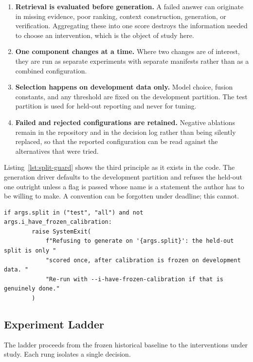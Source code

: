 \begin{enumerate}
  \item \textbf{Retrieval is evaluated before generation.} A failed answer can originate in missing evidence, poor ranking, context construction, generation, or verification. Aggregating these into one score destroys the information needed to choose an intervention, which is the object of study here.
  \item \textbf{One component changes at a time.} Where two changes are of interest, they are run as separate experiments with separate manifests rather than as a combined configuration.
  \item \textbf{Selection happens on development data only.} Model choice, fusion constants, and any threshold are fixed on the development partition. The test partition is used for held-out reporting and never for tuning.
  \item \textbf{Failed and rejected configurations are retained.} Negative ablations remain in the repository and in the decision log rather than being silently replaced, so that the reported configuration can be read against the alternatives that were tried.
\end{enumerate}

Listing~\ref{lst:split-guard} shows the third principle as it exists in the
code. The generation driver defaults to the development partition and refuses
the held-out one outright unless a flag is passed whose name is a statement the
author has to be willing to make. A convention can be forgotten under deadline;
this cannot.

\begin{lstlisting}[style=thesis,caption={The held-out split cannot be generated by accident. Source: \texttt{scripts/run\_generation.py}, lines 181--186.},label={lst:split-guard}]
    if args.split in ("test", "all") and not args.i_have_frozen_calibration:
        raise SystemExit(
            f"Refusing to generate on '{args.split}': the held-out split is only "
            "scored once, after calibration is frozen on development data. "
            "Re-run with --i-have-frozen-calibration if that is genuinely done."
        )
\end{lstlisting}

\subsection{Experiment Ladder}

The ladder proceeds from the frozen historical baseline to the interventions under study. Each rung isolates a single decision.

